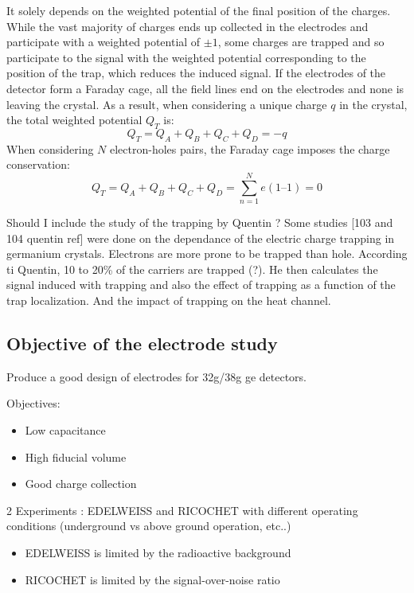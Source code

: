It solely depends on the weighted potential of the final position of the charges. While the vast majority of charges ends up collected in the electrodes and participate with a weighted potential of $\pm 1$, some charges are trapped and so participate to the signal with the weighted potential corresponding to the position of the trap, which reduces the induced signal.
If the electrodes of the detector form a Faraday cage, all the field lines end on the electrodes and none is leaving the crystal. As a result, when considering a unique charge $q$ in the crystal, the total weighted potential $Q_T$ is:
\begin{equation}
\label{eq:charge-conservation}
Q_T = Q_A + Q_B + Q_C + Q_D = -q
\end{equation}
When considering $N$ electron-holes pairs, the Faraday cage imposes the charge conservation:
\begin{equation}
\label{eq:charge-conservation}
Q_T = Q_A + Q_B + Q_C + Q_D = \sum_{n=1}^{N} e (1 – 1) = 0
\end{equation}

Should I include the study of the trapping by Quentin ? Some studies [103 and 104 quentin ref] were done on the dependance of the electric charge  trapping in germanium crystals. Electrons are more prone to be trapped than hole. According ti Quentin, 10 to 20\% of the carriers are trapped (?). He then calculates the signal induced with trapping and also the effect of trapping as a function of the trap localization. And the impact of trapping on the heat channel.


\subsection{Objective of the electrode study}

Produce a good design of electrodes for 32g/38g ge detectors.

Objectives:
\begin{itemize}
	\item Low capacitance
	\item High fiducial volume
	\item Good charge collection
\end{itemize}

2 Experiments : EDELWEISS and RICOCHET with different operating conditions (underground vs above ground operation, etc..)
\begin{itemize}
	\item EDELWEISS is limited by the radioactive background
	\item RICOCHET is limited by the signal-over-noise ratio
\end{itemize}



